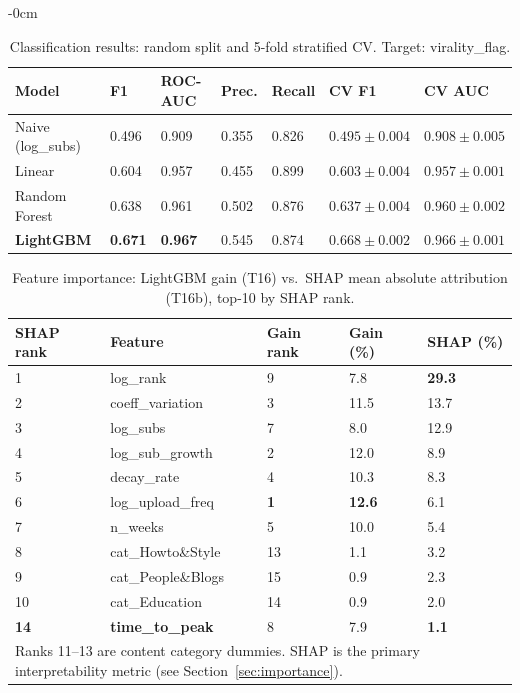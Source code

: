\documentclass[journal,article,submit,pdftex,moreauthors]{Definitions/mdpi}
\begin{document}
\begin{adjustwidth}{-\extralength}{0cm}
\begin{table}[H]
\caption{Classification results: random split and 5-fold stratified CV.
Target: virality\_flag.\label{tab:classification}}
\begin{tabularx}{\textwidth}{lllllll}
\toprule
\textbf{Model}&\textbf{F1}&\textbf{ROC-AUC}&\textbf{Prec.}&
\textbf{Recall}&\textbf{CV F1}&\textbf{CV AUC}\\
\midrule
Naive (log\_subs) & 0.496 & 0.909 & 0.355 & 0.826 &
  $0.495 \pm 0.004$ & $0.908 \pm 0.005$ \\
Linear            & 0.604 & 0.957 & 0.455 & 0.899 &
  $0.603 \pm 0.004$ & $0.957 \pm 0.001$ \\
Random Forest     & 0.638 & 0.961 & 0.502 & 0.876 &
  $0.637 \pm 0.004$ & $0.960 \pm 0.002$ \\
\textbf{LightGBM} &\textbf{0.671}&\textbf{0.967}& 0.545 & 0.874 &
  $\mathbf{0.668 \pm 0.002}$ & $\mathbf{0.966 \pm 0.001}$ \\
\bottomrule
\end{tabularx}
\end{table}

\begin{table}[H]
\caption{Feature importance: LightGBM gain (T16) vs.\ SHAP mean
absolute attribution (T16b), top-10 by SHAP rank.\label{tab:importance}}
\begin{tabularx}{\textwidth}{lllll}
\toprule
\textbf{SHAP rank}&\textbf{Feature}&\textbf{Gain rank}&
\textbf{Gain (\%)}&\textbf{SHAP (\%)}\\
\midrule
1  & log\_rank          & 9  &  7.8 & \textbf{29.3} \\
2  & coeff\_variation   & 3  & 11.5 & 13.7 \\
3  & log\_subs          & 7  &  8.0 & 12.9 \\
4  & log\_sub\_growth   & 2  & 12.0 &  8.9 \\
5  & decay\_rate        & 4  & 10.3 &  8.3 \\
6  & log\_upload\_freq  & \textbf{1} & \textbf{12.6} & 6.1 \\
7  & n\_weeks           & 5  & 10.0 &  5.4 \\
8  & cat\_Howto\&Style  & 13 &  1.1 &  3.2 \\
9  & cat\_People\&Blogs & 15 &  0.9 &  2.3 \\
10 & cat\_Education     & 14 &  0.9 &  2.0 \\
\midrule
\textbf{14} & \textbf{time\_to\_peak} & 8  & 7.9 & \textbf{1.1} \\
\bottomrule
\multicolumn{5}{l}{\footnotesize Ranks 11--13 are content category dummies.
SHAP is the primary interpretability metric (see Section~\ref{sec:importance}).}
\end{tabularx}
\end{table}


\end{adjustwidth}
\end{document}

